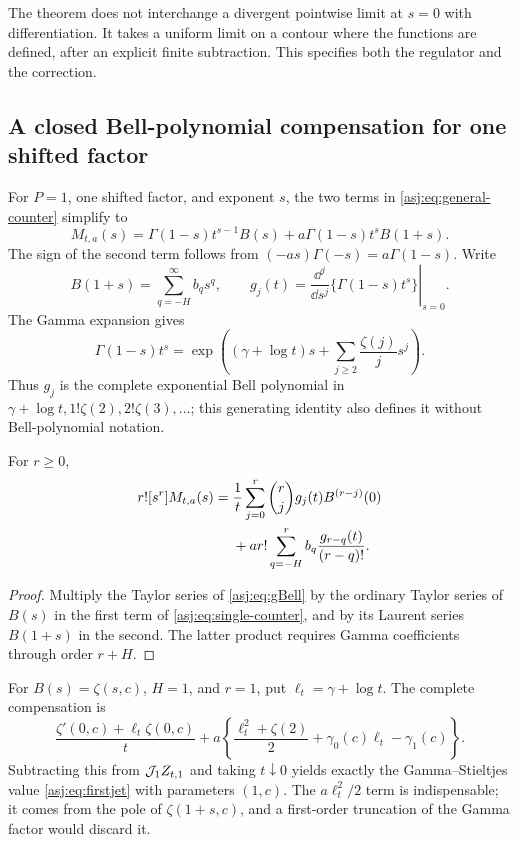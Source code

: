 The theorem does not interchange a divergent pointwise limit at $s=0$
with differentiation. It takes a uniform limit on a contour where the
functions are defined, after an explicit finite subtraction. This
specifies both the regulator and the correction.

\subsection{A closed Bell-polynomial compensation for one shifted factor}
For $P=1$, one shifted factor, and exponent $s$, the two terms in
\eqref{asj:eq:general-counter} simplify to
\begin{equation}\label{asj:eq:single-counter}
 M_{t,a}(s)=\Gamma(1-s)t^{s-1}B(s)
                 +a\Gamma(1-s)t^sB(1+s).
\end{equation}
The sign of the second term follows from
$(-as)\Gamma(-s)=a\Gamma(1-s)$.
Write
\[
 B(1+s)=\sum_{q=-H}^{\infty}b_qs^q,\qquad
 g_j(t)=\left.\frac{\dd^j}{\dd s^j}\{\Gamma(1-s)t^s\}\right|_{s=0}.
\]
The Gamma expansion \cite{dlmf-gamma} gives
\begin{equation}\label{asj:eq:gBell}
 \Gamma(1-s)t^s
   =\exp\left((\gamma+\log t)s
                     +\sum_{j\ge2}\frac{\zeta(j)}j s^j\right).
\end{equation}
Thus $g_j$ is the complete exponential Bell polynomial in
$\gamma+\log t,1!\zeta(2),2!\zeta(3),\ldots$; this generating identity
also defines it without Bell-polynomial notation.

\begin{corollary}
\label{asj:thm:bellcounter}
For $r\ge0$,
\begin{align}\label{asj:eq:Bellcounter}
 r![s^r]M_{t,a}(s)
   ={}&\frac1t\sum_{j=0}^r\binom rj g_j(t)B^{(r-j)}(0)\notag\\
     &+a r!\sum_{q=-H}^{r}b_q\frac{g_{r-q}(t)}{(r-q)!}.
\end{align}
\end{corollary}
\begin{proof}
Multiply the Taylor series of \eqref{asj:eq:gBell} by the ordinary Taylor
series of $B(s)$ in the first term of \eqref{asj:eq:single-counter}, and
by its Laurent series $B(1+s)$ in the second. The latter product
requires Gamma coefficients through order $r+H$.
\end{proof}

For $B(s)=\zeta(s,c)$, $H=1$, and $r=1$, put
$\ell_t=\gamma+\log t$. The complete compensation is
\begin{equation}\label{asj:eq:first-counter}
 \frac{\zeta'(0,c)+\ell_t\zeta(0,c)}t
     +a\left\{\frac{\ell_t^2+\zeta(2)}2
                    +\gamma_0(c)\ell_t-\gamma_1(c)\right\}.
\end{equation}
Subtracting this from $\mathcal J_1Z_{t,1}$ and taking $t\downarrow0$ yields
exactly the Gamma--Stieltjes value \eqref{asj:eq:firstjet} with parameters
$(1,c)$. The $a\ell_t^2/2$ term is indispensable; it comes from the
pole of $\zeta(1+s,c)$, and a first-order truncation of the Gamma factor
would discard it.

